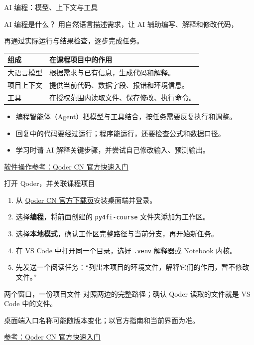 \documentclass[9pt]{ctexbeamer}
\begin{document}
\begin{frame}{AI 编程：模型、上下文与工具}
  \begin{block}{AI 编程是什么？}
    用自然语言描述需求，让 AI 辅助编写、解释和修改代码，\par
    再通过实际运行与结果检查，逐步完成任务。
  \end{block}
  \begin{tabular}{p{}p{}}
    \toprule
    组成 & 在课程项目中的作用 \\
    \midrule
    大语言模型 & 根据需求与已有信息，生成代码和解释。\\[7pt]
    项目上下文 & 提供当前代码、数据字段、报错和环境信息。\\[7pt]
    工具 & 在授权范围内读取文件、保存修改、执行命令。\\
    \bottomrule
  \end{tabular}
  \vspace{0.2cm}
  \begin{itemize}
    \item 编程智能体（Agent）把模型与工具结合，按任务需要反复执行和调整。
    \item 回复中的代码要经过运行；程序能运行，还要检查公式和数据口径。
    \item 学习时请 AI 解释关键步骤，并尝试自己修改输入、预测输出。
  \end{itemize}
  {\tiny\href{https://docs.qoder.cn/qoder/quickstart}{软件操作参考：Qoder CN 官方快速入门}}
\end{frame}

\begin{frame}{打开 Qoder，并关联课程项目}
  \begin{enumerate}
    \item 从 \href{https://qoder.cn/download}{Qoder CN 官方下载页}安装桌面端并登录。
    \item 选择\textbf{编程}，将前面创建的 \texttt{py4fi-course} 文件夹添加为工作区。
    \item 选择\textbf{本地模式}，确认工作区完整路径与当前分支，再开始新任务。
    \item 在 VS Code 中打开同一个目录，选好 \texttt{.venv} 解释器或 Notebook 内核。
    \item 先发送一个阅读任务：“列出本项目的环境文件，解释它们的作用，暂不修改文件。”
  \end{enumerate}
  \begin{block}{两个窗口，一份项目文件}
    对照两边的完整路径；确认 Qoder 读取的文件就是 VS Code 中的文件。
  \end{block}
  {\small 桌面端入口名称可能随版本变化；以官方指南和当前界面为准。}
  \par{\tiny\href{https://docs.qoder.cn/qoder/quickstart}{参考：Qoder CN 官方快速入门}}
\end{frame}
\end{document}
